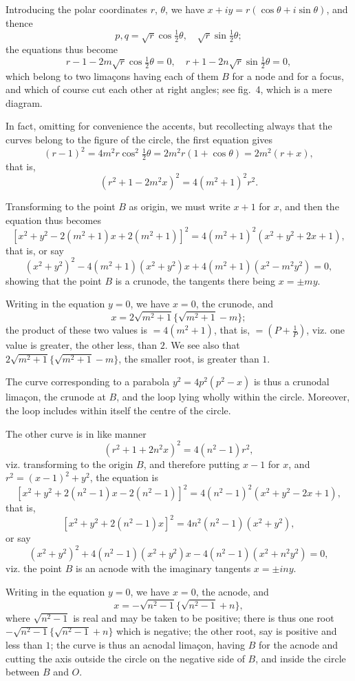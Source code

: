 \documentclass[11pt,a4paper]{article}
\theoremstyle{definition}
\begin{document}
Introducing the polar coordinates $r$, $\theta$, we have $x + iy = r(\cos\theta + i\sin\theta)$, and thence
\[
p, q = \sqrt{r}\cos\tfrac{1}{2}\theta, \quad \sqrt{r}\sin\tfrac{1}{2}\theta;
\]
the equations thus become
\[
r - 1 - 2m\sqrt{r}\cos\tfrac{1}{2}\theta = 0, \quad r + 1 - 2n\sqrt{r}\sin\tfrac{1}{2}\theta = 0,
\]
which belong to two lima\c{c}ons having each of them $B$ for a node and for a focus, and which of course cut each other at right angles; see fig.~4, which is a mere diagram.

In fact, omitting for convenience the accents, but recollecting always that the curves belong to the figure of the circle, the first equation gives
\[
(r - 1)^2 = 4m^2r\cos^2\tfrac{1}{2}\theta = 2m^2r(1 + \cos\theta) = 2m^2(r + x),
\]
that is,
\[
(r^2 + 1 - 2m^2x)^2 = 4(m^2 + 1)^2r^2.
\]

Transforming to the point $B$ as origin, we must write $x + 1$ for $x$, and then the equation thus becomes
\[
[x^2 + y^2 - 2(m^2 + 1)x + 2(m^2 + 1)]^2 = 4(m^2 + 1)^2(x^2 + y^2 + 2x + 1),
\]
that is, or say
\[
(x^2 + y^2)^2 - 4(m^2 + 1)(x^2 + y^2)x + 4(m^2 + 1)(x^2 - m^2y^2) = 0,
\]
showing that the point $B$ is a crunode, the tangents there being $x = \pm my$.

Writing in the equation $y = 0$, we have $x = 0$, the crunode, and
\[
x = 2\sqrt{m^2 + 1}\{\sqrt{m^2 + 1} - m\};
\]
the product of these two values is $= 4(m^2 + 1)$, that is, $= (P + \frac{1}{P})$, viz. one value is greater, the other less, than $2$. We see also that $2\sqrt{m^2 + 1}\{\sqrt{m^2 + 1} - m\}$, the smaller root, is greater than $1$.

The curve corresponding to a parabola $y^2 = 4p^2(p^2 - x)$ is thus a crunodal lima\c{c}on, the crunode at $B$, and the loop lying wholly within the circle. Moreover, the loop includes within itself the centre of the circle.

The other curve is in like manner
\[
(r^2 + 1 + 2n^2x)^2 = 4(n^2 - 1)r^2,
\]
viz. transforming to the origin $B$, and therefore putting $x - 1$ for $x$, and $r^2 = (x-1)^2 + y^2$, the equation is
\[
[x^2 + y^2 + 2(n^2 - 1)x - 2(n^2 - 1)]^2 = 4(n^2 - 1)^2(x^2 + y^2 - 2x + 1),
\]
that is,
\[
[x^2 + y^2 + 2(n^2 - 1)x]^2 = 4n^2(n^2 - 1)(x^2 + y^2),
\]
or say
\[
(x^2 + y^2)^2 + 4(n^2 - 1)(x^2 + y^2)x - 4(n^2 - 1)(x^2 + n^2y^2) = 0,
\]
viz. the point $B$ is an acnode with the imaginary tangents $x = \pm iny$.

Writing in the equation $y = 0$, we have $x = 0$, the acnode, and
\[
x = -\sqrt{n^2 - 1}\{\sqrt{n^2 - 1} + n\},
\]
where $\sqrt{n^2 - 1}$ is real and may be taken to be positive; there is thus one root $-\sqrt{n^2 - 1}\{\sqrt{n^2 - 1} + n\}$ which is negative; the other root, say is positive and less than $1$; the curve is thus an acnodal lima\c{c}on, having $B$ for the acnode and cutting the axis outside the circle on the negative side of $B$, and inside the circle between $B$ and $O$.
\end{document}
